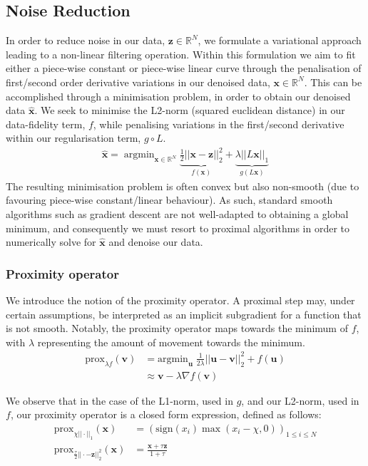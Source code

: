 \documentclass[12pt]{article}
\begin{document}
\subsection{Noise Reduction}
In order to reduce noise in our data, $\bm{z} \in \mathbb{R}^N$, we formulate a variational approach leading to a non-linear filtering operation. Within this formulation we aim to fit either a piece-wise constant or piece-wise linear curve through the penalisation of first/second order derivative variations in our denoised data, $\bm{x} \in \mathbb{R}^N$. This can be accomplished through a minimisation problem, in order to obtain our denoised data $\bm{\hat{x}}$. We seek to minimise the L2-norm (squared euclidean distance) in our data-fidelity term, $f$, while penalising variations in the first/second derivative within our regularisation term, $g\circ L$.
\begin{gather}
  \bm{\hat{x}} = \operatorname{argmin}_{\bm{x} \in \mathbb{R}^N}
  \underbrace{\frac{1}{2}{||\bm{x}-\bm{z}||^2_2}}_{f(\bm{x})} + \underbrace{\lambda||L\bm{x}||_1}_{g(L\bm{x})}
  \label{eqn:minim}
\end{gather}
The resulting minimisation problem is often convex but also non-smooth (due to favouring piece-wise constant/linear behaviour). As such, standard smooth algorithms such as gradient descent are not well-adapted to obtaining a global minimum, and consequently we must resort to proximal algorithms in order to numerically solve for $\bm{\hat{x}}$ and denoise our data.

\subsubsection{Proximity operator}
We introduce the notion of the proximity operator\cite{proximal-algorithms,fixed-point}. A proximal step may, under certain assumptions, be interpreted as an implicit subgradient for a function that is not smooth. Notably, the proximity operator maps towards the minimum of $f$, with $\lambda$ representing the amount of movement towards the minimum.
\begin{align}
    \text{prox}_{\lambda f}{(\bm{v})} &= \text{argmin}_{\bm{u}}{\;\frac{1}{2\lambda}{||\bm{u}-\bm{v}||^2_2+f(\bm{u})}} \\
    &\approx \bm{v} - \lambda \nabla f(\bm{v})
\end{align}

\noindent We observe that in the case of the L1-norm, used in $g$, and our L2-norm, used in $f$, our proximity operator is a closed form expression, defined as follows:
\begin{align}
    \text{prox}_{\chi ||\cdot||_1}(\bm{x}) &= (\text{sign}(x_i)\max{(x_i-\chi, 0)})_{1\leq i \leq N} \\
    \text{prox}_{\frac{\tau}{2}||\cdot - \bm{z}||^2_2}{(\bm{x})} &= \frac{\bm{x}+\tau \bm{z}}{1+\tau}
\end{align}
\end{document}
